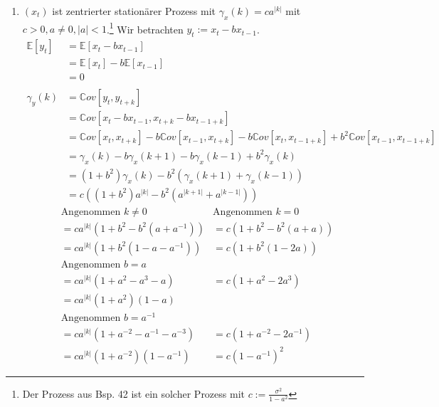 \documentclass[a4paper,11pt,notitlepage,fullpage]{article}
\newcommand{\E}[1]{\mathbb E\left[#1\right]}
\newcommand{\Cov}[1]{\mathbb Cov\left[#1\right]}
\begin{document}
\begin{enumerate}
\item $(x_t)$ ist zentrierter stationärer Prozess mit $\gamma_x(k) = ca^{|k|}$ mit $c>0, a\neq0, |a|<1$.\footnote{Der Prozess aus Bsp. 42 ist ein solcher Prozess mit $c := \frac{\sigma^2}{1-a^2}$} Wir betrachten $y_t := x_t - bx_{t-1}$.
\begin{align*}
\E{y_t} &= \E{x_t - bx_{t-1}} \\
&= \E{x_t} - b\E{x_{t-1}} \\
&= 0 \\ \\
\gamma_y(k) &= \Cov{y_t, y_{t+k}} \\
&= \Cov{x_t - bx_{t-1}, x_{t+k} - bx_{t-1+k}} \\
&= \Cov{x_t, x_{t+k}} - b \Cov{x_{t-1}, x_{t+k}} - b \Cov{x_t, x_{t-1+k}} + b^2 \Cov{x_{t-1}, x_{t-1+k}} \\
&= \gamma_x(k) - b\gamma_x(k+1) - b\gamma_x(k-1) + b^2 \gamma_x(k) \\
&= \left(1+b^2\right)\gamma_x(k) - b^2\left(\gamma_x(k+1) + \gamma_x(k-1)\right) \\
&= c\left(\left(1+b^2\right)a^{|k|} - b^2\left(a^{|k+1|} + a^{|k-1|}\right)\right)
\end{align*}
\begin{align*}
&\text{Angenommen }k \neq 0 &\text{Angenommen }k = 0 \\
&= ca^{|k|}\left(1+b^2 - b^2\left(a + a^{-1}\right)\right) &= c\left(1+b^2 - b^2\left(a + a\right)\right)\\
&= ca^{|k|}\left(1 + b^2\left(1 - a - a^{-1}\right)\right) &= c\left(1 + b^2\left(1 - 2a\right)\right) \\
&\text{Angenommen }b = a \\
&= ca^{|k|}\left(1 + a^2 - a^3 - a\right) &= c\left(1 + a^2 - 2a^3\right)\\
&= ca^{|k|} (1 + a^2) (1-a) \\
&\text{Angenommen }b = a^{-1} \\
&= ca^{|k|}\left(1 + a^{-2} - a^{-1} - a^{-3}\right) &= c\left(1 + a^{-2} - 2a^{-1}\right)\\
&= ca^{|k|}(1 + a^{-2})(1-a^{-1}) &= c(1-a^{-1})^2
\end{align*}



\end{enumerate}
\end{document}
